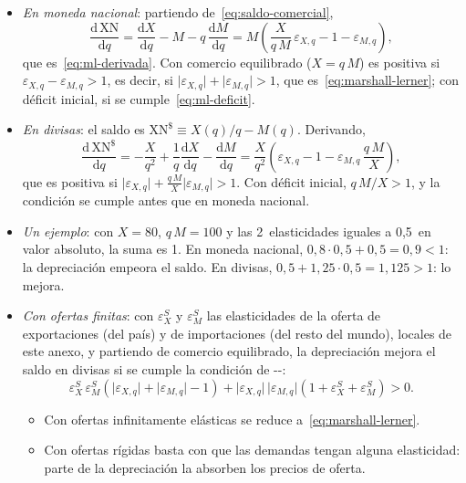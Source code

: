 \documentclass[11pt]{article}
\begin{document}
\begin{itemize}
\item \emph{En moneda nacional}: partiendo de~\eqref{eq:saldo-comercial},
  \[
  \frac{\mathrm d\,\mathrm{XN}}{\mathrm dq}=\frac{\mathrm dX}{\mathrm dq}-M-q\,\frac{\mathrm dM}{\mathrm dq}
  =M\left(\frac{X}{q\,M}\,\varepsilon_{X,q}-1-\varepsilon_{M,q}\right),
  \]
  que es~\eqref{eq:ml-derivada}. Con comercio equilibrado ($X=q\,M$) es positiva si $\varepsilon_{X,q}-\varepsilon_{M,q}>1$, es decir, si $\lvert\varepsilon_{X,q}\rvert+\lvert\varepsilon_{M,q}\rvert>1$, que es~\eqref{eq:marshall-lerner}; con déficit inicial, si se cumple~\eqref{eq:ml-deficit}. \findemo
\item \emph{En divisas}: el saldo es $\mathrm{XN}^{\$}\equiv X(q)/q-M(q)$. Derivando,
  \[
  \frac{\mathrm d\,\mathrm{XN}^{\$}}{\mathrm dq}=-\frac{X}{q^2}+\frac{1}{q}\frac{\mathrm dX}{\mathrm dq}-\frac{\mathrm dM}{\mathrm dq}=\frac{X}{q^2}\left(\varepsilon_{X,q}-1-\varepsilon_{M,q}\,\frac{q\,M}{X}\right),
  \]
  que es positiva si $\lvert\varepsilon_{X,q}\rvert+\frac{q\,M}{X}\lvert\varepsilon_{M,q}\rvert>1$. Con déficit inicial, $q\,M/X>1$, y la condición se cumple antes que en moneda nacional. \findemo
\item \emph{Un ejemplo}: con $X=80$, $q\,M=100$ y las 2~elasticidades iguales a 0,5~en valor absoluto, la suma es 1. En moneda nacional, $0{,}8\cdot0{,}5+0{,}5=0{,}9<1$: la depreciación empeora el saldo. En divisas, $0{,}5+1{,}25\cdot0{,}5=1{,}125>1$: lo mejora.
\item \emph{Con ofertas finitas}: con $\varepsilon^S_X$ y $\varepsilon^S_M$ las elasticidades de la oferta de exportaciones (del país) y de importaciones (del resto del mundo), locales de este anexo, y partiendo de comercio equilibrado, la depreciación mejora el saldo en divisas si se cumple la condición de --:
  \[
  \varepsilon^S_X\,\varepsilon^S_M\left(\lvert\varepsilon_{X,q}\rvert+\lvert\varepsilon_{M,q}\rvert-1\right)+\lvert\varepsilon_{X,q}\rvert\,\lvert\varepsilon_{M,q}\rvert\left(1+\varepsilon^S_X+\varepsilon^S_M\right)>0 .
  \]
  \begin{itemize}
  \item Con ofertas infinitamente elásticas se reduce a~\eqref{eq:marshall-lerner}.
  \item Con ofertas rígidas basta con que las demandas tengan alguna elasticidad: parte de la depreciación la absorben los precios de oferta\nocite{Gandolfo2016International}.
  \end{itemize}
\end{itemize}
\end{document}
